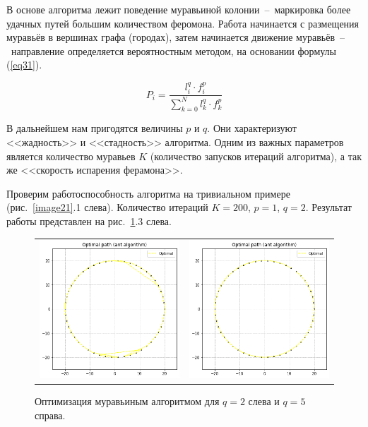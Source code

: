 \documentclass[12pt, a4paper]{article}
\begin{document}
    В основе алгоритма лежит поведение муравьиной колонии~--~маркировка 
    более удачных путей большим количеством феромона. Работа начинается с 
    размещения муравьёв в вершинах графа (городах), затем начинается 
    движение муравьёв~--~направление определяется вероятностным методом, на 
    основании формулы (\ref{eq31}).
    
    \begin{equation}
        P_{i} = \frac{l_{i}^{q} \cdot f_{i}^{p}}{\sum_{k=0}^{N} l_{k}^{q} 
            \cdot f_{k}^{p}}
        \label{eq31}
    \end{equation}
    
    В дальнейшем нам пригодятся величины $p$ и $q$. Они характеризуют 
    <<жадность>> и <<стадность>> алгоритма. Одним из важных параметров 
    является количество муравьев $K$ (количество запусков итераций 
    алгоритма), а так же <<скорость испарения ферамона>>.
    
    Проверим работоспособность алгоритма на тривиальном примере 
    (рис.~\ref{image21}.1 слева). Количество итераций $K = 200$, $p = 1$, $q 
    = 2$. Результат работы представлен на рис.~\ref{image33}.3 слева.
    
    \begin{figure}[h!]
        \center
        \begin{tabular}{cc}
            \includegraphics[width = 6cm]{dots1_2_1.png} &
            \includegraphics[width = 6cm]{dots1_2_2.png} \\
        \end{tabular}
        \label{image33}
        \caption{Оптимизация муравьиным алгоритмом для $q = 2$ слева и $q = 
            5$ справа.}
    \end{figure}
    
\end{document}
